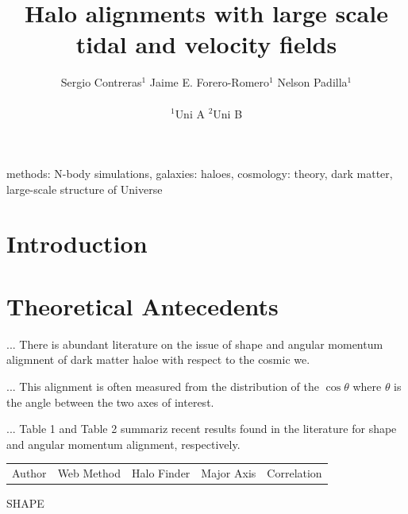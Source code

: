 \documentclass[usenatbib]{mn2e}
\begin{document}
\title[Vweb \& Tweb]{Halo alignments with large scale tidal and
  velocity fields} 
\author[S. Contreras et al.]{
\parbox[t]{\textwidth}{\raggedright 
  Sergio Contreras$^{1}$ 
  Jaime E. Forero-Romero$^{1}$ 
  Nelson Padilla$^{1}$ 
}
\vspace*{6pt}\\
$^{1}$Uni A
$^{2}$Uni B
}
\maketitle

\begin{abstract}

\end{abstract}
\begin{keywords}
methods: N-body simulations, galaxies: haloes, cosmology: theory, dark
matter, large-scale structure of Universe 
\end{keywords}


\section{Introduction}
\label{sec:introduction}


\section{Theoretical Antecedents}
\label{sec:theory}

... There is abundant literature on the issue of shape and angular momentum
aligmnent of dark matter haloe with respect to the cosmic we.

... This alignment is often measured from the distribution of the
$\cos\theta$ where $\theta$ is the angle between the two axes of
interest.

... Table 1 and Table 2 summariz recent results found in the literature for
shape and angular momentum alignment, respectively.






\citep{Faltenbacher2009} %
\citep{Paz2008} %
\citep{Platen2008} %
\citep{Lee2007}%


\begin{table}
\begin{tabular}{lllll}
Author & Web Method & Halo Finder & Major Axis & Correlation\\
\end{tabular}
SHAPE
\end{table}
\end{document}
